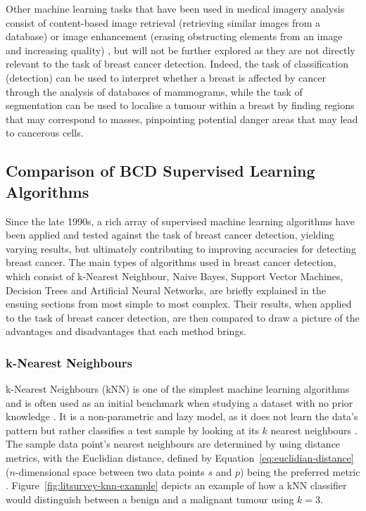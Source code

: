 Other machine learning tasks that have been used in medical imagery analysis consist of content-based image retrieval (retrieving similar images from a database) or image enhancement (erasing obstructing elements from an image and increasing quality) \citep{Litjens2017}, but will not be further explored as they are not directly relevant to the task of breast cancer detection. Indeed, the task of classification (detection) can be used to interpret whether a breast is affected by cancer through the analysis of databases of mammograms, while the task of segmentation can be used to localise a tumour within a breast by finding regions that may correspond to masses, pinpointing potential danger areas that may lead to cancerous cells.

\subsection{Comparison of BCD Supervised Learning Algorithms}

Since the late 1990s, a rich array of supervised machine learning algorithms have been applied and tested against the task of breast cancer detection, yielding varying results, but ultimately contributing to improving accuracies for detecting breast cancer. The main types of algorithms used in breast cancer detection, which consist of k-Nearest Neighbour, Naive Bayes, Support Vector Machines, Decision Trees and Artificial Neural Networks, are briefly explained in the ensuing sections from most simple to most complex. Their results, when applied to the task of breast cancer detection, are then compared to draw a picture of the advantages and disadvantages that each method brings.

\subsubsection{k-Nearest Neighbours}
\label{sec:litreview-knn}

k-Nearest Neighbours (kNN) is one of the simplest machine learning algorithms and is often used as an initial benchmark when studying a dataset with no prior knowledge \citep{peterson2009k}. It is a non-parametric and lazy model, as it does not learn the data's pattern but rather classifies a test sample by looking at its $k$ nearest neighbours \citep{Yue2018}. The sample data point's nearest neighbours are determined by using distance metrics, with the Euclidian distance, defined by Equation~\ref{eq:euclidian-distance} ($n$-dimensional space between two data points $s$ and $p$) being the preferred metric \citep{peterson2009k}. Figure~\ref{fig:litsurvey-knn-example} depicts an example of how a kNN classifier would distinguish between a benign and a malignant tumour using $k=3$.

